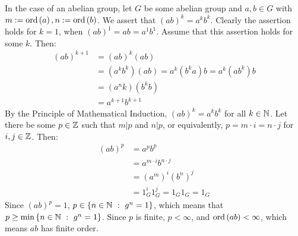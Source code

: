 \documentclass{article}
\begin{document}
In the case of an abelian group, let $G$ be some abelian group and $a, b \in G$ with $m := \operatorname{ord}\left(a\right), n := \operatorname{ord}\left(b\right)$. We assert that $\left(ab\right)^k = a^kb^k$. Clearly the assertion holds for $k = 1$, when $\left(ab\right)^1 = ab = a^1b^1$. Assume that this assertion holds for some $k$. Then:
\begin{equation}
    \begin{split}
        \left(ab\right)^{k + 1} & = \left(ab\right)^k\left(ab\right) \\
        & = \left(a^kb^k\right)\left(ab\right) = a^k\left(b^ka\right)b = a^k\left(ab^k\right)b \\
        & = \left(a^nk\right)\left(b^kb\right) \\
        & = a^{k+1}b^{k+1}
    \end{split}
\end{equation}
By the Principle of Mathematical Induction, $\left(ab\right)^k = a^kb^k$ for all $k \in \mathbb{N}$. Let there be some $p \in \mathbb{Z}$ such that $m|p$ and $n|p$, or equivalently, $p = m \cdot i = n \cdot j$ for $i, j \in \mathbb{Z}$. Then:
\begin{equation}
    \begin{split}
        \left(ab\right)^p & = a^pb^p \\
        & = a^{m \cdot i}b^{n \cdot j} \\
        & = \left(a^m\right)^i\left(b^n\right)^j \\
        & = 1_G^i1_G^j = 1_G1_G = 1_G
    \end{split}
\end{equation}
Since $\left(ab\right)^p = 1$, $p \in \left\{ n\in \mathbb{N} \ : \  g^n = 1 \right\}$, which means that $p \geq \min\left\{ n\in \mathbb{N} \ : \  g^n = 1 \right\}$. Since $p$ is finite, $p < \infty$, and $\operatorname{ord}\left(ab\right) < \infty$, which means $ab$ has finite order.

\clearpage

\end{document}
